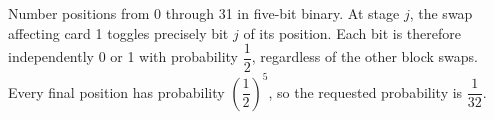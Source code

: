 Number positions from 0 through 31 in five-bit binary. At stage $j$, the swap affecting card 1 toggles precisely bit $j$ of its position. Each bit is therefore independently 0 or 1 with probability $\dfrac{1}{2}$, regardless of the other block swaps. Every final position has probability $(\dfrac{1}{2})^5$, so the requested probability is $\boxed{\dfrac{1}{32}}$.
